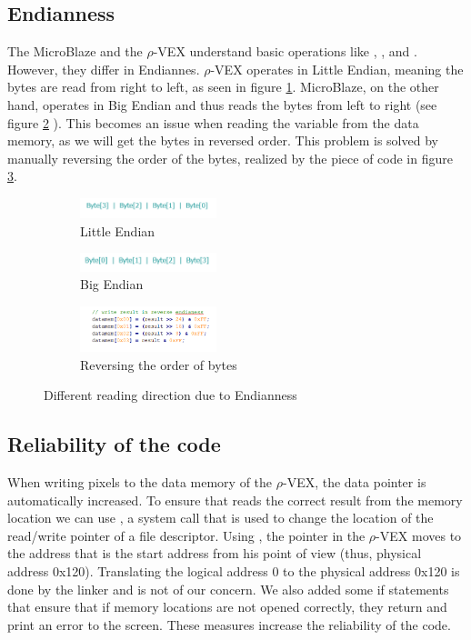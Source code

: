 \subsection{Endianness}
\label{sec:endian}
The MicroBlaze and the $\rho$-VEX understand basic operations like , ,  and . However, they differ in Endiannes. $\rho$-VEX operates in Little Endian, meaning the bytes are read from right to left, as seen in figure \ref{fig:little}. MicroBlaze, on the other hand, operates in Big Endian and thus reads the bytes from left to right (see figure \ref{fig:big} ). This becomes an issue when reading the  variable from the data memory, as we will get the bytes in reversed order. This problem is solved by manually reversing the order of the  bytes, realized by the piece of code in figure \ref{fig:swap}.

\begin{figure}[htb]
	\centering
	\begin{subfigure} [h] {0.5\textwidth}
		\centering
		\includegraphics[width=150px]{Pictures/little}
		\caption{Little Endian}
		\label{fig:little}
	\end{subfigure}
	\quad
	\begin{subfigure} [h] {0.5\textwidth}
		\centering
		\includegraphics[width=150px]{Pictures/big}
		\caption{Big Endian}
		\label{fig:big}
	\end{subfigure}
	\quad
	\begin{subfigure} [h] {0.5\textwidth}
		\centering
		\includegraphics[width=150px]{Pictures/byteswap}
		\caption{Reversing the order of bytes}
		\label{fig:swap}
	\end{subfigure}
\caption{Different reading direction due to Endianness}%
\label{}%
\end{figure}

\subsection{Reliability of the code}
\label{sec:reliable}
When writing pixels to the data memory of the $\rho$-VEX, the data pointer is automatically increased. To ensure that  reads the correct result from the memory location we can use , a system call that is used to change the location of the read/write pointer of a file descriptor. Using , the pointer in the $\rho$-VEX moves to the address that is the start address from his point of view (thus, physical address 0x120). Translating the logical address 0 to the physical address 0x120 is done by the linker and is not of our concern. We also added some if statements that ensure that if memory locations are not opened correctly, they return  and print an error to the screen. These measures increase the reliability of the code. 
